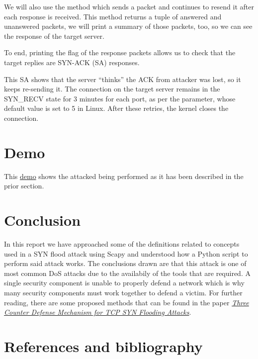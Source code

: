 \documentclass[11pt]{article}
\begin{document}
We will also use the method \texttt{} which sends a packet and continues to resend it after each response is received. This method returns a tuple of answered and unanswered packets, we will print a summary of those packets, too, so we can see the response of the target server.\vspace{5mm}

To end, printing the flag of the response packets allows us to check that the target replies are SYN-ACK (SA) responses.\vspace{5mm}

This SA shows that the server “thinks” the ACK from attacker was lost, so it keeps re-sending it. The connection on the target server remains in the SYN\_RECV state for 3 minutes for each port, as per the \texttt{} parameter, whose default value is set to 5 in Linux. After these retries, the kernel closes the connection.\vspace{5mm}

\section{Demo}
This \href{}{demo} shows the attacked being performed as it has been described in the prior section.

\section{Conclusion}
In this report we have approached some of the definitions related to concepts used in a SYN flood attack using Scapy and understood how a Python script to perform said attack works. The conclusions drawn are that this attack is one of most common DoS attacks due to the availabily of the tools that are required. A single security component is unable to properly defend a network which is why many security components must work together to defend a victim. For further reading, there are some proposed methods that can be found in the paper \emph{\href{http://citeseerx.ist.psu.edu/viewdoc/download?doi=10.1.1.206.5378&rep=rep1&type=pdf}{Three Counter Defense Mechanism for TCP SYN Flooding Attacks}}. 

\clearpage
\section{References and bibliography}
\end{document}
